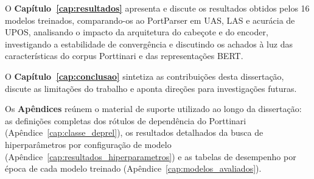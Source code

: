 O \textbf{Capítulo~\ref{cap:resultados}} apresenta e discute os resultados obtidos pelos
16 modelos treinados, comparando-os ao PortParser em UAS, LAS e acurácia de UPOS, analisando
o impacto da arquitetura do cabeçote e do encoder, investigando a estabilidade de convergência
e discutindo os achados à luz das características do corpus Porttinari e das representações
BERT.

O \textbf{Capítulo~\ref{cap:conclusao}} sintetiza as contribuições desta dissertação,
discute as limitações do trabalho e aponta direções para investigações futuras.

Os \textbf{Apêndices} reúnem o material de suporte utilizado ao longo da dissertação: as
definições completas dos rótulos de dependência do Porttinari
(Apêndice~\ref{cap:classe_deprel}), os resultados detalhados da busca de hiperparâmetros
por configuração de modelo (Apêndice~\ref{cap:resultados_hiperparametros}) e as tabelas de
desempenho por época de cada modelo treinado (Apêndice~\ref{cap:modelos_avaliados}).
